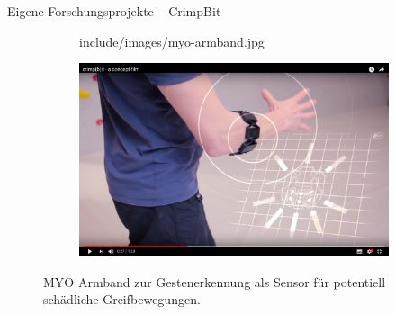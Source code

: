 \begin{frame}{Eigene Forschungsprojekte -- Crimp\textcolor{tertiary}{Bit}}
\begin{figure}[h]
	\centering
	\begin{subfigure}[t]{0.35\columnwidth}
		\centering
		\begin{overpic}[width=\textwidth]{include/images/myo-armband.jpg}
		\end{overpic}
		\label{fig:myo-armband}
	\end{subfigure}
	\hspace*{\fill}
	\begin{subfigure}[t]{0.62\columnwidth}
		\centering
		\includegraphics[width=\textwidth]{include/images/myo-demo.jpg}
		\label{fig:crimpbit-demo}
	\end{subfigure}
	\caption{MYO Armband zur Gestenerkennung als Sensor für potentiell schädliche Greifbewegungen.}
	\label{fig:crimpbit}
\end{figure}
\end{frame}

